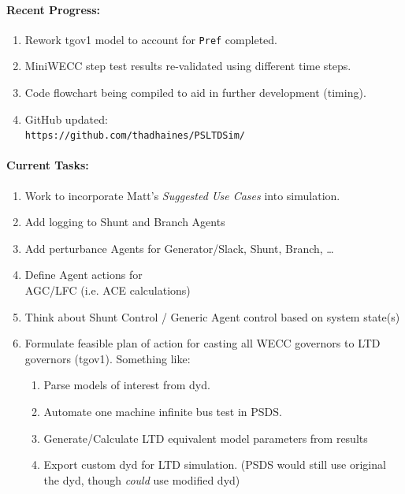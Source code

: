 \documentclass[12pt]{article}
\begin{document}
\begin{multicols}{2}

	\paragraph{Recent Progress:}
	\begin{enumerate}

		\item Rework tgov1 model to account for \verb|Pref| completed.

		\item MiniWECC step test results re-validated using different time steps.

		\item Code flowchart being compiled to aid in further development (timing).

		

		\item GitHub updated:\\
		\verb|https://github.com/thadhaines/PSLTDSim/|
		
	\end{enumerate}
\paragraph{Current Tasks:}
	\begin{enumerate}
		\item Work to incorporate Matt's \emph{Suggested Use Cases} into simulation.

		\item Add logging to Shunt and Branch Agents
		
		\item Add perturbance Agents for Generator/Slack, Shunt, Branch, \ldots
		\item Define Agent actions for \\ AGC/LFC (i.e. ACE calculations)

		\item Think about Shunt Control / Generic Agent control based on system state(s)

		\item Formulate feasible plan of action for casting all WECC governors to LTD governors (tgov1). Something like:
		\begin{enumerate}
		\item Parse models of interest from dyd.
		\item Automate one machine infinite bus test in PSDS.
		\item Generate/Calculate LTD equivalent model parameters from results
		\item Export custom dyd for LTD simulation. (PSDS would still use original the dyd, though \emph{could} use modified dyd)
		\end{enumerate}
		

\end{enumerate}
\end{multicols}
\end{document}
